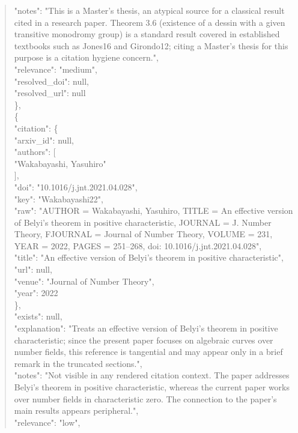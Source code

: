 \documentclass[11pt]{article}
\begin{document}
\begin{quote}
      "notes": "This is a Master's thesis, an atypical source for a classical result cited in a research paper. Theorem 3.6 (existence of a dessin with a given transitive monodromy group) is a standard result covered in established textbooks such as Jones16 and Girondo12; citing a Master's thesis for this purpose is a citation hygiene concern.",\\
      "relevance": "medium",\\
      "resolved\_doi": null,\\
      "resolved\_url": null\\
    \},\\
    \{\\
      "citation": \{\\
        "arxiv\_id": null,\\
        "authors": [\\
          "Wakabayashi, Yasuhiro"\\
        ],\\
        "doi": "10.1016/j.jnt.2021.04.028",\\
        "key": "Wakabayashi22",\\
        "raw": "AUTHOR = Wakabayashi, Yasuhiro, TITLE = An effective version of Belyi's theorem in positive characteristic, JOURNAL = J. Number Theory, FJOURNAL = Journal of Number Theory, VOLUME = 231, YEAR = 2022, PAGES = 251--268, doi: 10.1016/j.jnt.2021.04.028",\\
        "title": "An effective version of Belyi's theorem in positive characteristic",\\
        "url": null,\\
        "venue": "Journal of Number Theory",\\
        "year": 2022\\
      \},\\
      "exists": null,\\
      "explanation": "Treats an effective version of Belyi's theorem in positive characteristic; since the present paper focuses on algebraic curves over number fields, this reference is tangential and may appear only in a brief remark in the truncated sections.",\\
      "notes": "Not visible in any rendered citation context. The paper addresses Belyi's theorem in positive characteristic, whereas the current paper works over number fields in characteristic zero. The connection to the paper's main results appears peripheral.",\\
      "relevance": "low",\\

\end{quote}
\end{document}
